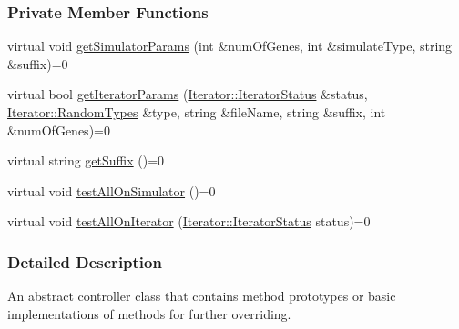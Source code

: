\subsubsection*{Private Member Functions}
\begin{DoxyCompactItemize}
\item 
virtual void \hyperlink{class_interactor_a63d581b5afbf258b25915b318c1216c7}{get\+Simulator\+Params} (int \&num\+Of\+Genes, int \&simulate\+Type, string \&suffix)=0
\item 
virtual bool \hyperlink{class_interactor_a6e98daf626d09b585375eec2d5311f25}{get\+Iterator\+Params} (\hyperlink{class_iterator_a1eb24c519953c2a333ea4a345b0c679c}{Iterator\+::\+Iterator\+Status} \&status, \hyperlink{class_iterator_a68bc1c5e7ad39ed78690beaa8a607430}{Iterator\+::\+Random\+Types} \&type, string \&file\+Name, string \&suffix, int \&num\+Of\+Genes)=0
\item 
virtual string \hyperlink{class_interactor_af3d8accfc60634bf82be9c438c0b9400}{get\+Suffix} ()=0
\item 
virtual void \hyperlink{class_interactor_ac2282b0725d5bd6216edb0f2ea4dd421}{test\+All\+On\+Simulator} ()=0
\item 
virtual void \hyperlink{class_interactor_aeeec69df23673e87530a1b1db98998ee}{test\+All\+On\+Iterator} (\hyperlink{class_iterator_a1eb24c519953c2a333ea4a345b0c679c}{Iterator\+::\+Iterator\+Status} status)=0
\end{DoxyCompactItemize}


\subsubsection{Detailed Description}
An abstract controller class that contains method prototypes or basic implementations of methods for further overriding. 

